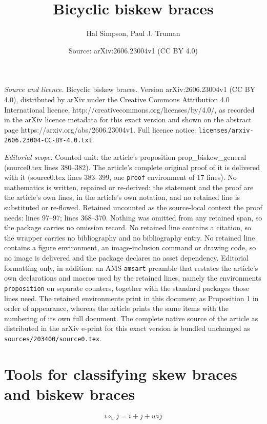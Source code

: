 \documentclass[10pt,a4paper]{amsart}
\title{Bicyclic biskew braces}
\author{Hal Simpson, Paul J. Truman}
\date{Source: arXiv:2606.23004v1 (CC BY 4.0)}
\begin{document}
\maketitle

\noindent\emph{Source and licence.} Bicyclic biskew braces. Version arXiv:2606.23004v1 (CC BY 4.0), distributed by arXiv under the Creative Commons Attribution 4.0 International licence, http://creativecommons.org/licenses/by/4.0/, as recorded in the arXiv licence metadata for this exact version and shown on the abstract page https://arxiv.org/abs/2606.23004v1. Full licence notice: \texttt{licenses/arxiv-2606.23004-CC-BY-4.0.txt}.\par\smallskip

\noindent\textit{Editorial scope.} Counted unit: the article's proposition prop\_biskew\_general (source0.tex lines 380--382). The article's complete original proof of it is delivered with it (source0.tex lines 383--399, one \texttt{proof} environment of 17 lines). No mathematics is written, repaired or re-derived: the statement and the proof are the article's own lines, in the article's own notation, and no retained line is substituted or re-flowed.  Retained uncounted as the source-local context the proof needs: lines 97--97; lines 368--370.  Nothing was omitted from any retained span, so the package carries no omission record.  No retained line contains a citation, so the wrapper carries no bibliography and no bibliography entry.  No retained line contains a figure environment, an image-inclusion command or drawing code, so no image is delivered and the package declares no asset dependency.  Editorial formatting only, in addition: an AMS \texttt{amsart} preamble that restates the article's own declarations and macros used by the retained lines, namely the environments \texttt{proposition} on separate counters, together with the standard packages those lines need.  The retained environments print in this document as Proposition 1 in order of appearance, whereas the article prints the same items with the numbering of its own full document.  The complete native source of the article as distributed in the arXiv e-print for this exact version is bundled unchanged as \texttt{sources/203400/source0.tex}.
\section{Tools for classifying skew braces and biskew braces} \label{sec_tools}

\begin{equation} \label{eqn_circle}
i \circ_{w} j = i + j + wij
\end{equation}
\end{document}
